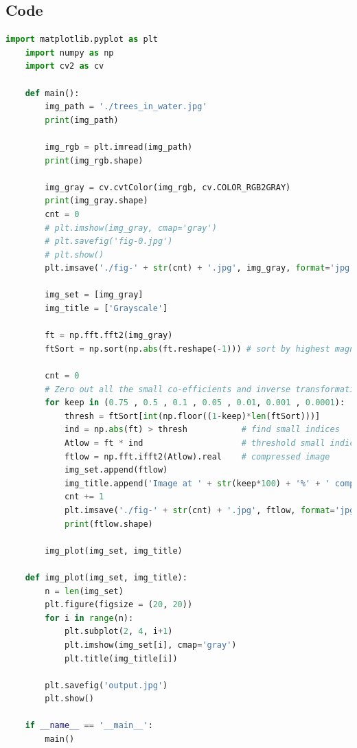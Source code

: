\documentclass{article}
\begin{document}
{    \subsection{Code}
    \lstset{style=mystyle}
    \begin{lstlisting}[language=Python, caption=Code for Image Compression on Frequency Domain]
    import matplotlib.pyplot as plt
    import numpy as np
    import cv2 as cv
    
    def main():
        img_path = './trees_in_water.jpg'
        print(img_path)
    
        img_rgb = plt.imread(img_path)
        print(img_rgb.shape)
    
        img_gray = cv.cvtColor(img_rgb, cv.COLOR_RGB2GRAY)
        print(img_gray.shape)
        cnt = 0
        # plt.imshow(img_gray, cmap='gray')
        # plt.savefig('fig-0.jpg')
        # plt.show()
        plt.imsave('./fig-' + str(cnt) + '.jpg', img_gray, format='jpg', cmap='gray')
    
        img_set = [img_gray]
        img_title = ['Grayscale']
    
        ft = np.fft.fft2(img_gray)
        ftSort = np.sort(np.abs(ft.reshape(-1))) # sort by highest magnitude
    
        cnt = 0
        # Zero out all the small co-efficients and inverse transformation
        for keep in (0.75 , 0.5 , 0.1 , 0.05 , 0.01, 0.001 , 0.0001):
            thresh = ftSort[int(np.floor((1-keep)*len(ftSort)))]
            ind = np.abs(ft) > thresh           # find small indices
            Atlow = ft * ind                    # threshold small indices
            ftlow = np.fft.ifft2(Atlow).real    # compressed image
            img_set.append(ftlow)
            img_title.append('Image at ' + str(keep*100) + '%' + ' compression')
            cnt += 1
            plt.imsave('./fig-' + str(cnt) + '.jpg', ftlow, format='jpg', cmap='gray')
            print(ftlow.shape)
    
        img_plot(img_set, img_title)
    
    def img_plot(img_set, img_title):
        n = len(img_set)
        plt.figure(figsize = (20, 20))
        for i in range(n):
            plt.subplot(2, 4, i+1)
            plt.imshow(img_set[i], cmap='gray')
            plt.title(img_title[i])
            
        plt.savefig('output.jpg')
        plt.show()
    
    if __name__ == '__main__':
        main()
    

\end{lstlisting}}
\end{document}
